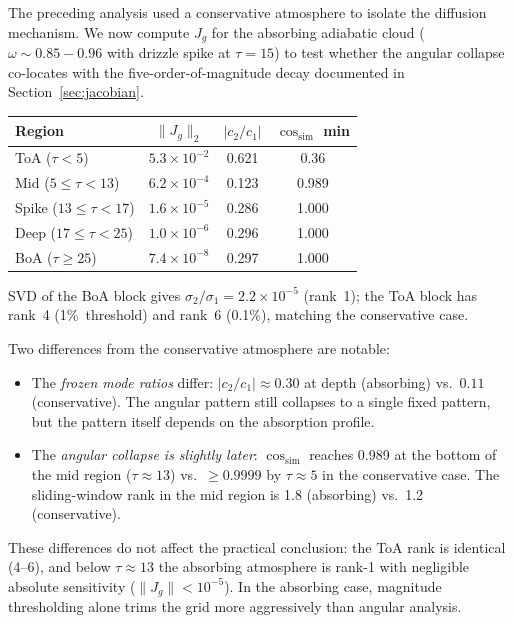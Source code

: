 \documentclass[11pt]{article}
\newcommand{\norm}[1]{\lVert #1 \rVert}
\begin{document}
The preceding analysis used a conservative atmosphere to isolate
the diffusion mechanism.  We now compute $J_g$ for the absorbing
adiabatic cloud ($\omega \sim 0.85{-}0.96$ with drizzle spike at
$\tau=15$) to test whether the angular collapse co-locates with
the five-order-of-magnitude decay documented in
Section~\ref{sec:jacobian}.

\begin{center}
\begin{tabular}{l c c c}
\toprule
Region & $\norm{J_g}_2$ & $|c_2/c_1|$ & $\cos_\mathrm{sim}$ min\\
\midrule
ToA ($\tau<5$)       & $5.3\times10^{-2}$ & 0.621 & 0.36\\
Mid ($5\!\leq\!\tau\!<\!13$) & $6.2\times10^{-4}$ & 0.123 & 0.989\\
Spike ($13\!\leq\!\tau\!<\!17$) & $1.6\times10^{-5}$ & 0.286 & 1.000\\
Deep ($17\!\leq\!\tau\!<\!25$) & $1.0\times10^{-6}$ & 0.296 & 1.000\\
BoA ($\tau\geq 25$)  & $7.4\times10^{-8}$ & 0.297 & 1.000\\
\bottomrule
\end{tabular}
\end{center}

SVD of the BoA block gives $\sigma_2/\sigma_1 = 2.2\times10^{-5}$
(rank~1); the ToA block has rank~4 (1\%~threshold) and rank~6
(0.1\%), matching the conservative case.

Two differences from the conservative atmosphere are notable:
\begin{itemize}
\item The \emph{frozen mode ratios} differ: $|c_2/c_1| \approx 0.30$
  at depth (absorbing) vs.\ $0.11$ (conservative).  The angular
  pattern still collapses to a single fixed pattern, but the
  pattern itself depends on the absorption profile.
\item The \emph{angular collapse is slightly later}: $\cos_\mathrm{sim}$
  reaches 0.989 at the bottom of the mid region ($\tau\approx 13$)
  vs.\ $\geq 0.9999$ by $\tau\approx 5$ in the conservative case.
  The sliding-window rank in the mid region is 1.8 (absorbing)
  vs.\ 1.2 (conservative).
\end{itemize}
These differences do not affect the practical conclusion:
the ToA rank is identical (4--6), and below $\tau\approx 13$
the absorbing atmosphere is rank-1 with negligible absolute
sensitivity ($\norm{J_g} < 10^{-5}$).  In the absorbing case,
magnitude thresholding alone trims the grid more aggressively
than angular analysis.
\end{document}
